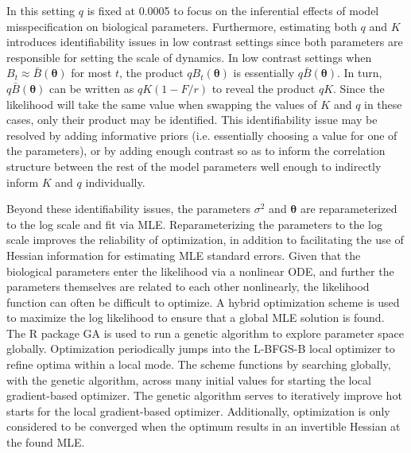 In this setting $q$ is fixed at 0.0005 to focus on
the inferential effects of model misspecification on biological parameters. 
Furthermore, estimating both $q$ and $K$ introduces identifiability 
issues in low contrast settings since both parameters are responsible for 
setting the scale of dynamics. %
In low contrast settings when $B_t\approx\bar B(\bm{\theta})$ for most $t$, 
the product $qB_t(\bm{\theta})$ is essentially $q\bar B(\bm{\theta})$. In turn, %
$q\bar B(\bm{\theta})$ can be written as $qK(1-F/r)$ to reveal the product $qK$. 
Since the likelihood will take the same value when swapping the values of $K$ 
and $q$ in these cases, only their product may be identified. %
This identifiability issue may be resolved by adding informative priors (i.e. 
essentially choosing a value for one of the parameters), or by adding enough 
contrast so as to inform the correlation structure between the rest of the model 
parameters well enough to indirectly inform $K$ and $q$ individually.

Beyond these identifiability issues, the parameters $\sigma^2$ and $\bm{\theta}$ 
are reparameterized to the log scale and fit via MLE.
Reparameterizing the parameters to the log scale improves the reliability
of optimization, in addition to facilitating the use of Hessian information
for estimating MLE standard errors.
%
Given that the biological parameters enter the likelihood via a nonlinear ODE,
and further the parameters themselves are related to each other nonlinearly,
the likelihood function can often be difficult to optimize. A hybrid optimization
scheme is used to maximize the log likelihood to ensure that a global MLE solution
is found. The R package GA \cite{scrucca_ga_2013, scrucca_extensions_2017} is
used to run a genetic algorithm to explore parameter space globally.
Optimization periodically jumps into the L-BFGS-B local optimizer to refine
optima within a local mode. The scheme functions by searching globally, with the genetic
algorithm, across many initial values for starting the local gradient-based optimizer.
The genetic algorithm serves to iteratively improve hot starts for the local
gradient-based optimizer. Additionally, optimization is only considered to be converged
when the optimum results in an invertible Hessian at the found MLE.

